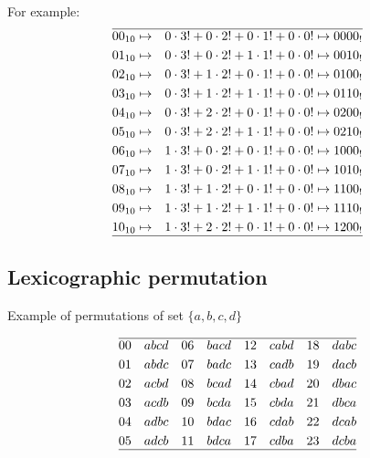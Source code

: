 \documentclass{article}
\begin{document}
For example:
\begin{align*}
    \hline
    00_{10} & \mapsto & 0 \cdot 3! + 0 \cdot 2! + 0 \cdot 1! + 0 \cdot 0! \mapsto 0000_{!} \\
    01_{10} & \mapsto & 0 \cdot 3! + 0 \cdot 2! + 1 \cdot 1! + 0 \cdot 0! \mapsto 0010_{!} \\
    02_{10} & \mapsto & 0 \cdot 3! + 1 \cdot 2! + 0 \cdot 1! + 0 \cdot 0! \mapsto 0100_{!} \\
    03_{10} & \mapsto & 0 \cdot 3! + 1 \cdot 2! + 1 \cdot 1! + 0 \cdot 0! \mapsto 0110_{!} \\
    04_{10} & \mapsto & 0 \cdot 3! + 2 \cdot 2! + 0 \cdot 1! + 0 \cdot 0! \mapsto 0200_{!} \\
    05_{10} & \mapsto & 0 \cdot 3! + 2 \cdot 2! + 1 \cdot 1! + 0 \cdot 0! \mapsto 0210_{!} \\
    06_{10} & \mapsto & 1 \cdot 3! + 0 \cdot 2! + 0 \cdot 1! + 0 \cdot 0! \mapsto 1000_{!} \\
    07_{10} & \mapsto & 1 \cdot 3! + 0 \cdot 2! + 1 \cdot 1! + 0 \cdot 0! \mapsto 1010_{!} \\
    08_{10} & \mapsto & 1 \cdot 3! + 1 \cdot 2! + 0 \cdot 1! + 0 \cdot 0! \mapsto 1100_{!} \\
    09_{10} & \mapsto & 1 \cdot 3! + 1 \cdot 2! + 1 \cdot 1! + 0 \cdot 0! \mapsto 1110_{!} \\
    10_{10} & \mapsto & 1 \cdot 3! + 2 \cdot 2! + 0 \cdot 1! + 0 \cdot 0! \mapsto 1200_{!} \\
   \hline
\end{align*}

\newpage
\subsection{Lexicographic permutation}

Example of permutations of set $\{a, b, c, d\}$

\begin{align*}
    \hline
    00 \quad abcd && 06 \quad bacd && 12 \quad cabd && 18 \quad dabc \\
    01 \quad abdc && 07 \quad badc && 13 \quad cadb && 19 \quad dacb \\
    02 \quad acbd && 08 \quad bcad && 14 \quad cbad && 20 \quad dbac \\
    03 \quad acdb && 09 \quad bcda && 15 \quad cbda && 21 \quad dbca \\
    04 \quad adbc && 10 \quad bdac && 16 \quad cdab && 22 \quad dcab \\
    05 \quad adcb && 11 \quad bdca && 17 \quad cdba && 23 \quad dcba \\
    \hline
\end{align*}
\newline
\end{document}
